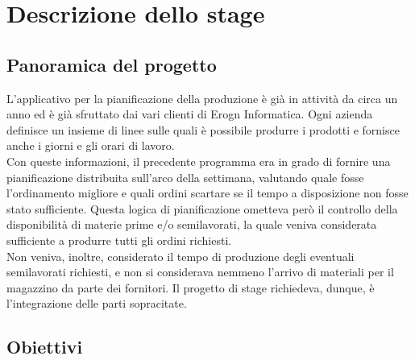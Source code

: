 
\chapter{Descrizione dello stage}
\label{cap:Descrizione-dello-stage}

\section{Panoramica del progetto}
L'applicativo per la pianificazione della produzione è già in attività da circa un anno ed è già sfruttato dai vari clienti di Erogn Informatica. Ogni azienda definisce un insieme di linee sulle quali è possibile produrre i prodotti e fornisce anche i giorni e gli orari di lavoro.
\\Con queste informazioni, il precedente programma era in grado di fornire una pianificazione distribuita sull'arco della settimana, valutando quale fosse l'ordinamento migliore e quali ordini scartare se il tempo a disposizione non fosse stato sufficiente. Questa logica di pianificazione ometteva però il controllo della disponibilità di materie prime e/o semilavorati,
 la quale veniva considerata sufficiente a produrre tutti gli ordini richiesti.\\ Non veniva, inoltre, considerato il tempo di produzione degli eventuali semilavorati richiesti, e non si considerava nemmeno l'arrivo di materiali per il magazzino da parte dei fornitori.
Il progetto di stage richiedeva, dunque, è l'integrazione delle parti sopracitate.

\newpage
\section{Obiettivi}

